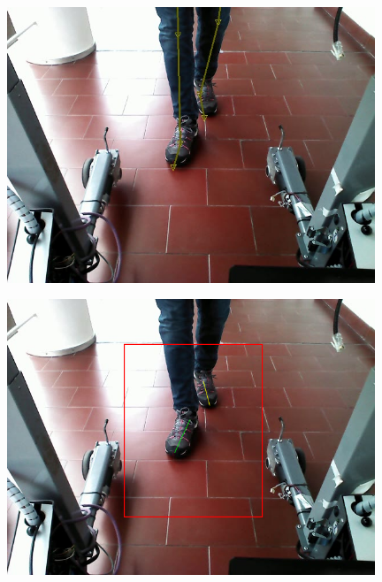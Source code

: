 \documentclass[a4paper]{report}
\begin{document}

\begin{figure}[H]
\centering
\begin{minipage}{.5\textwidth}
  \centering
    \includegraphics[width=0.98\textwidth]{images/building/results/frameGT50.png}
\end{minipage}%
\begin{minipage}{.5\textwidth}
  \centering
    \includegraphics[width=0.98\textwidth]{images/building/results/frame50.png}
    \label{img:Frame50}
\end{minipage}%
\end{figure}
\end{document}
